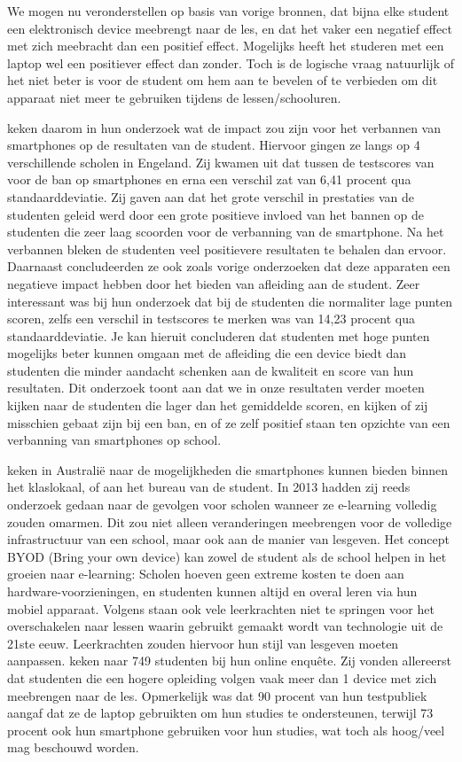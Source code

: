 We mogen nu veronderstellen op basis van vorige bronnen, dat bijna elke student een elektronisch device meebrengt naar de les, en dat het vaker een negatief effect met zich meebracht dan een positief effect. Mogelijks heeft het studeren met een laptop wel een positiever effect dan zonder. Toch is de logische vraag natuurlijk of het niet beter is voor de student om hem aan te bevelen of te verbieden om dit apparaat niet meer te gebruiken tijdens de lessen/schooluren.

\textcite{Beland2016} keken daarom in hun onderzoek wat de impact zou zijn voor het verbannen van smartphones op de resultaten van de student. Hiervoor gingen ze langs op 4 verschillende scholen in Engeland. Zij kwamen uit dat tussen de testscores van voor de ban op smartphones en erna een verschil zat van 6,41 procent qua standaarddeviatie. Zij gaven aan dat het grote verschil in prestaties van de studenten geleid werd door een grote positieve invloed van het bannen op de studenten die zeer laag scoorden voor de verbanning van de smartphone. Na het verbannen bleken de studenten veel positievere resultaten te behalen dan ervoor. Daarnaast concludeerden ze ook zoals vorige onderzoeken dat deze apparaten een negatieve impact hebben door het bieden van afleiding aan de student. Zeer interessant was bij hun onderzoek dat bij de studenten die normaliter lage punten scoren, zelfs een verschil in testscores te merken was van 14,23 procent qua standaarddeviatie. Je kan hieruit concluderen dat studenten met hoge punten mogelijks beter kunnen omgaan met de afleiding die een device biedt dan studenten die minder aandacht schenken aan de kwaliteit en score van hun resultaten. Dit onderzoek toont aan dat we in onze resultaten verder moeten kijken naar de studenten die lager dan het gemiddelde scoren, en kijken of zij misschien gebaat zijn bij een ban, en of ze zelf positief staan ten opzichte van een verbanning van smartphones op school.

\textcite{Farley2015} keken in Australië naar de mogelijkheden die smartphones kunnen bieden binnen het klaslokaal, of aan het bureau van de student. In 2013 hadden zij reeds onderzoek gedaan naar de gevolgen voor scholen wanneer ze e-learning volledig zouden omarmen. Dit zou niet alleen veranderingen meebrengen voor de volledige infrastructuur van een school, maar ook aan de manier van lesgeven. Het concept BYOD (Bring your own device) kan zowel de student als de school helpen in het groeien naar e-learning: Scholen hoeven geen extreme kosten te doen aan hardware-voorzieningen, en studenten kunnen altijd en overal leren via hun mobiel apparaat. Volgens \textcite{Crompton2014} staan ook vele leerkrachten niet te springen voor het overschakelen naar lessen waarin gebruikt gemaakt wordt van technologie uit de 21ste eeuw. Leerkrachten zouden hiervoor hun stijl van lesgeven moeten aanpassen. \textcite{Farley2015} keken naar 749 studenten bij hun online enquête. Zij vonden allereerst dat studenten die een hogere opleiding volgen vaak meer dan 1 device met zich meebrengen naar de les. Opmerkelijk was dat 90 procent van hun testpubliek aangaf dat ze de laptop gebruikten om hun studies te ondersteunen, terwijl 73 procent ook hun smartphone gebruiken voor hun studies, wat toch als hoog/veel mag beschouwd worden. 

